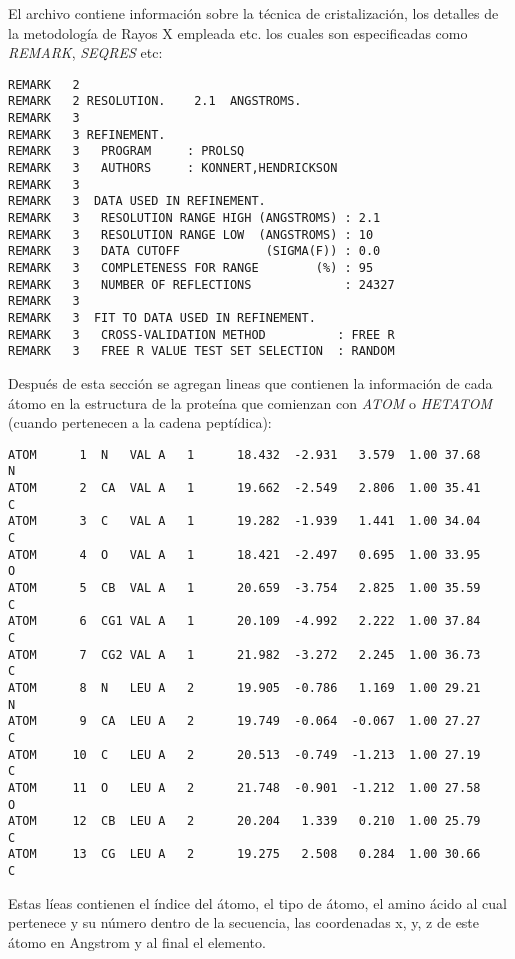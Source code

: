 \documentclass[11pt]{exam}
\begin{document}
El archivo contiene informaci\'on sobre la t\'ecnica de cristalizaci\'on, los detalles de la metodolog\'ia de Rayos X empleada etc. los cuales son especificadas como \textit{REMARK}, \textit{SEQRES} etc: 
\begin{verbatim}
REMARK   2                                                                      
REMARK   2 RESOLUTION.    2.1  ANGSTROMS.                                       
REMARK   3                                                                      
REMARK   3 REFINEMENT.                                                          
REMARK   3   PROGRAM     : PROLSQ                                               
REMARK   3   AUTHORS     : KONNERT,HENDRICKSON                                  
REMARK   3                                                                      
REMARK   3  DATA USED IN REFINEMENT.                                            
REMARK   3   RESOLUTION RANGE HIGH (ANGSTROMS) : 2.1                            
REMARK   3   RESOLUTION RANGE LOW  (ANGSTROMS) : 10                             
REMARK   3   DATA CUTOFF            (SIGMA(F)) : 0.0                            
REMARK   3   COMPLETENESS FOR RANGE        (%) : 95                             
REMARK   3   NUMBER OF REFLECTIONS             : 24327                          
REMARK   3                                                                      
REMARK   3  FIT TO DATA USED IN REFINEMENT.                                     
REMARK   3   CROSS-VALIDATION METHOD          : FREE R                          
REMARK   3   FREE R VALUE TEST SET SELECTION  : RANDOM                      
\end{verbatim}


Despu\'es de esta secci\'on se agregan lineas que contienen la informaci\'on de cada \'atomo en la estructura de la prote\'ina que comienzan con \textit{ATOM} o \textit{HETATOM} (cuando pertenecen a la cadena pept\'idica): 
\begin{verbatim}
ATOM      1  N   VAL A   1      18.432  -2.931   3.579  1.00 37.68           N  
ATOM      2  CA  VAL A   1      19.662  -2.549   2.806  1.00 35.41           C  
ATOM      3  C   VAL A   1      19.282  -1.939   1.441  1.00 34.04           C  
ATOM      4  O   VAL A   1      18.421  -2.497   0.695  1.00 33.95           O  
ATOM      5  CB  VAL A   1      20.659  -3.754   2.825  1.00 35.59           C  
ATOM      6  CG1 VAL A   1      20.109  -4.992   2.222  1.00 37.84           C  
ATOM      7  CG2 VAL A   1      21.982  -3.272   2.245  1.00 36.73           C  
ATOM      8  N   LEU A   2      19.905  -0.786   1.169  1.00 29.21           N  
ATOM      9  CA  LEU A   2      19.749  -0.064  -0.067  1.00 27.27           C  
ATOM     10  C   LEU A   2      20.513  -0.749  -1.213  1.00 27.19           C  
ATOM     11  O   LEU A   2      21.748  -0.901  -1.212  1.00 27.58           O  
ATOM     12  CB  LEU A   2      20.204   1.339   0.210  1.00 25.79           C  
ATOM     13  CG  LEU A   2      19.275   2.508   0.284  1.00 30.66           C 
\end{verbatim}
Estas l\'ieas contienen el \'indice del \'atomo, el tipo de \'atomo, el amino \'acido al cual pertenece y su n\'umero dentro de la secuencia, las coordenadas x, y, z de este \'atomo en Angstrom y al final el elemento.
\end{document}
